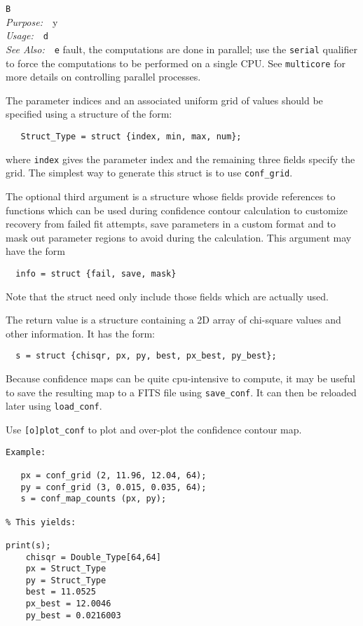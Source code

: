 \documentclass{book}
\makeatletter
\newif\ifpdf
\newenvironment{isisfunction}[4]%
{\index{{#1}@{\tt #1}}%
  \ifpdf
  \else
     \addcontentsline{toc}{subsection}{{#1} -- {#2}}
  \fi
  \vbox{
          \vspace*{\baselineskip}
          {\LARGE\tt #1}\vspace*{\baselineskip}\\
          {{\it Purpose:}~~{#2}}\\
          {{\it Usage:}~~{\tt #3}}\\
          {{\it See Also:}~~{\tt #4}}
       }
}%
{ }
\makeatother
\begin{document}
{\begin{isisfunction}
By default, the computations are done in parallel; use the
\verb|serial| qualifier to force the computations to be
performed on a single CPU.  See \verb|multicore| for more
details on controlling parallel processes.

The parameter indices and an associated uniform grid of values
should be specified using a structure of the form:
\begin{verbatim}
   Struct_Type = struct {index, min, max, num};
\end{verbatim}
where \verb|index| gives the parameter index and the remaining
three fields specify the grid.  The simplest way to generate
this struct is to use \verb|conf_grid|.

The optional third argument is a structure whose fields provide
references to functions which can be used during confidence
contour calculation to customize recovery from failed fit
attempts, save parameters in a custom format and to mask out
parameter regions to avoid during the calculation.
This argument may have the form
\begin{verbatim}
  info = struct {fail, save, mask}
\end{verbatim}
Note that the struct need only include those fields
which are actually used.

The return value is a structure containing a 2D array of
chi-square values and other information.  It has the form:
\begin{verbatim}
  s = struct {chisqr, px, py, best, px_best, py_best};
\end{verbatim}

Because confidence maps can be quite cpu-intensive to compute, it
may be useful to save the resulting map to a FITS file using
\verb|save_conf|.  It can then be reloaded later using
\verb|load_conf|.

Use \verb|[o]plot_conf| to plot and over-plot the confidence
contour map.

\begin{verbatim}
Example:

   px = conf_grid (2, 11.96, 12.04, 64);
   py = conf_grid (3, 0.015, 0.035, 64);
   s = conf_map_counts (px, py);

% This yields:

print(s);
    chisqr = Double_Type[64,64]
    px = Struct_Type
    py = Struct_Type
    best = 11.0525
    px_best = 12.0046
    py_best = 0.0216003
\end{verbatim}


\end{isisfunction}}
\end{document}
